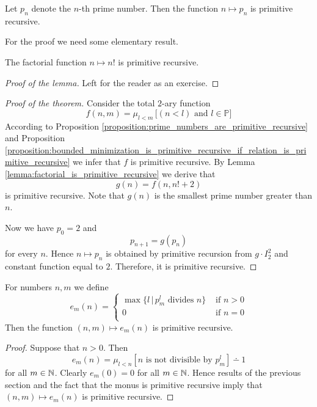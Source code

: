 \documentclass[10pt]{amsart}
\begin{document}
\begin{theorem}\label{theorem:prime_sequence_is_primitive_recursive}
	Let $p_n$ denote the $n$-th prime number. Then the function $n \mapsto p_n$ is primitive recursive.
\end{theorem}
\noindent
For the proof we need some elementary result.

\begin{lemma}\label{lemma:factorial_is_primitive_recursive}
	The factorial function $n \mapsto n!$ is primitive recursive.
\end{lemma}
\begin{proof}[Proof of the lemma]
	Left for the reader as an exercise.
\end{proof}

\begin{proof}[Proof of the theorem]
	Consider the total $2$-ary function
	$$f(n, m) = \mu_{l < m}\,\big[\left(n < l\right)\mbox{ and }l \in \mathbb{P}\big]$$
	According to Proposition \ref{proposition:prime_numbers_are_primitive_recursive} and Proposition \ref{proposition:bounded_minimization_is_primitive_recursive_if_relation_is_primitive_recursive} we infer that $f$ is primitive recursive. By Lemma \ref{lemma:factorial_is_primitive_recursive} we derive that
	$$g(n) = f(n,n!+2)$$
	is primitive recursive. Note that $g(n)$ is the smallest prime number greater than $n$.

	Now we have $p_0 = 2$ and
	$$p_{n+1} = g(p_n)$$
	for every $n$. Hence $n \mapsto p_n$ is obtained by primitive recursion from $g\cdot I^2_2$ and constant function equal to $2$. Therefore, it is primitive recursive.
\end{proof}

\begin{proposition}\label{proposition:prime_exponent_is_primitive_recursive}
	For numbers $n,m$ we define
	$$e_{m}(n) = \begin{cases}
			\max \big\{l\,|\,p_m^l\mbox{ divides }n\big\} & \mbox{ if }n > 0 \\
			0                                             & \mbox{ if }n = 0 \\
		\end{cases}
	$$
	Then the function $(n,m) \mapsto e_{m}(n)$ is primitive recursive.
\end{proposition}
\begin{proof}
	Suppose that $n > 0$. Then
	$$e_m(n) = \mu_{l < n}\left[n\mbox{ is not divisible by }p_m^l\right] \dotminus 1$$
	for all $m \in {\mathbb N}$. Clearly $e_m(0) = 0$ for all $m \in {\mathbb N}$. Hence results of the previous section and the fact that the monus is primitive recursive imply that $(n,m) \mapsto e_{m}(n)$ is primitive recursive.
\end{proof}
\end{document}
